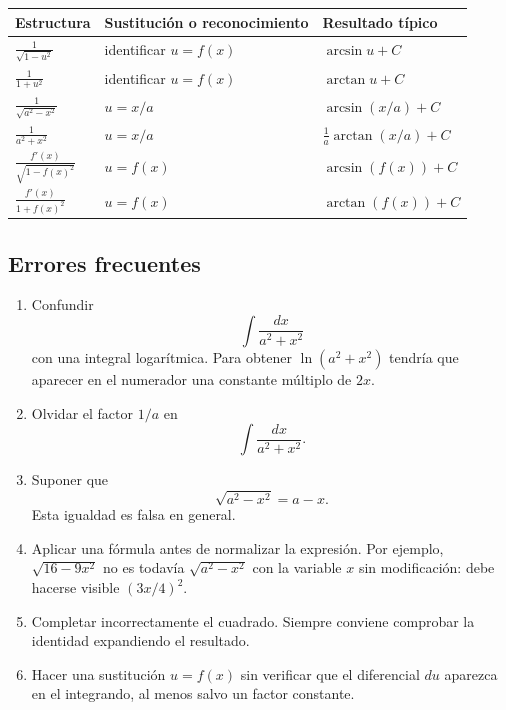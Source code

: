 \documentclass[12pt]{article}
\theoremstyle{definition}
\theoremstyle{remark}
\begin{document}
\begin{center}
\renewcommand{\arraystretch}{1.6}
\begin{tabular}{>{\centering\arraybackslash}p{}
                >{\centering\arraybackslash}p{}
                >{\centering\arraybackslash}p{}}
\toprule
\textbf{Estructura} & \textbf{Sustitución o reconocimiento} & \textbf{Resultado típico}\\
\midrule
$\displaystyle \frac{1}{\sqrt{1-u^2}}$
& identificar $u=f(x)$
& $\arcsin u+C$\\
$\displaystyle \frac{1}{1+u^2}$
& identificar $u=f(x)$
& $\arctan u+C$\\
$\displaystyle \frac{1}{\sqrt{a^2-x^2}}$
& $u=x/a$
& $\arcsin(x/a)+C$\\
$\displaystyle \frac{1}{a^2+x^2}$
& $u=x/a$
& $\frac1a\arctan(x/a)+C$\\
$\displaystyle \frac{f'(x)}{\sqrt{1-f(x)^2}}$
& $u=f(x)$
& $\arcsin(f(x))+C$\\
$\displaystyle \frac{f'(x)}{1+f(x)^2}$
& $u=f(x)$
& $\arctan(f(x))+C$\\
\bottomrule
\end{tabular}
\end{center}

\subsection{Errores frecuentes}

\begin{enumerate}
\item Confundir
\[
\int\frac{dx}{a^2+x^2}
\]
con una integral logarítmica. Para obtener $\ln(a^2+x^2)$ tendría que aparecer
en el numerador una constante múltiplo de $2x$.

\item Olvidar el factor $1/a$ en
\[
\int\frac{dx}{a^2+x^2}.
\]

\item Suponer que
\[
\sqrt{a^2-x^2}=a-x.
\]
Esta igualdad es falsa en general.

\item Aplicar una fórmula antes de normalizar la expresión. Por ejemplo,
$\sqrt{16-9x^2}$ no es todavía $\sqrt{a^2-x^2}$ con la variable $x$ sin
modificación: debe hacerse visible $(3x/4)^2$.

\item Completar incorrectamente el cuadrado. Siempre conviene comprobar la
identidad expandiendo el resultado.

\item Hacer una sustitución $u=f(x)$ sin verificar que el diferencial $du$
aparezca en el integrando, al menos salvo un factor constante.
\end{enumerate}
\end{document}
